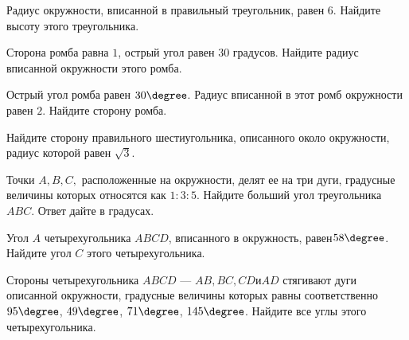 \begin{class}[number=8]
\begin{listofex}
		\item Радиус окружности, вписанной в правильный треугольник, равен \(6\). Найдите высоту этого треугольника.
		\item Сторона ромба равна \(1\), острый угол равен \(30\) градусов. Найдите радиус вписанной окружности этого ромба.
		\item Острый угол ромба равен \(30\degree \). Радиус вписанной в этот ромб окружности равен \(2\). Найдите сторону ромба.
		\item Найдите сторону правильного шестиугольника, описанного около окружности, радиус которой равен \(\sqrt{3}\).
		
		\item Точки \(A, B, C,\) расположенные на окружности, делят ее на три дуги, градусные величины которых относятся как \(1 : 3 : 5\). Найдите больший угол треугольника \(ABC\). Ответ дайте в градусах.
		\item Угол \(A\) четырехугольника \(ABCD\), вписанного в окружность, равен\(58 \degree \). Найдите угол \(C\) этого четырехугольника.
		\item Стороны четырехугольника \(ABCD\) --- \(AB, BC, CD и AD\) стягивают дуги описанной окружности, градусные величины которых равны соответственно \(95\degree \), \(49\degree\), \(71\degree\), \(145\degree\). Найдите все углы этого четырехугольника.
	\end{listofex}
\end{class}
